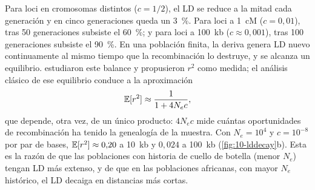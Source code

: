 Para loci en cromosomas distintos ($c=1/2$), el LD se reduce a la mitad cada generación y en cinco generaciones queda un \SI{3}{\percent}. Para loci a \SI{1}{cM} ($c=0{,}01$), tras 50 generaciones subsiste el \SI{60}{\percent}; y para loci a \SI{100}{kb} ($c\approx0{,}001$), tras 100 generaciones subsiste el \SI{90}{\percent}. En una población finita, la deriva genera LD nuevo continuamente al mismo tiempo que la recombinación lo destruye, y se alcanza un equilibrio. \textcite{c10-hill1968} estudiaron este balance y propusieron $r^2$ como medida; el análisis clásico de ese equilibrio conduce a la aproximación
\begin{equation}\label{eq:10-sved}
\mathbb{E}[r^2] \approx \frac{1}{1+4N_e c},
\end{equation}
que depende, otra vez, de un único producto: $4N_ec$ mide cuántas oportunidades de recombinación ha tenido la genealogía de la muestra. Con $N_e=10^4$ y $c=10^{-8}$ por par de bases, $\mathbb{E}[r^2]\approx0{,}20$ a \SI{10}{kb} y $0{,}024$ a \SI{100}{kb} (\cref{fig:10-lddecay}b). Esta es la razón de que las poblaciones con historia de cuello de botella (menor $N_e$) tengan LD más extenso, y de que en las poblaciones africanas, con mayor $N_e$ histórico, el LD decaiga en distancias más cortas.

